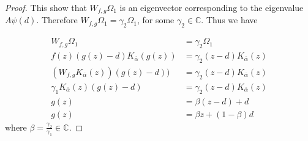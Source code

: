 \documentclass[reqno]{amsart}
\theoremstyle{remark}
\theoremstyle{Definition}
\theoremstyle{remark}
\numberwithin{equation}{section}
\begin{document}
\begin{proof}
This show that $W_{f,g}\Omega_{1}$  is an eigenvector corresponding to the eigenvalue $A\psi(d)$. Therefore $W_{f,g}\Omega_{1}=\gamma_{2}\Omega_{1}$, for some $\gamma_{2} \in \mathbb{C}$. Thus we have

\begin{align*}
   W_{f,g}\Omega_{1}&=\gamma_{2}\Omega_{1}\\
    f(z) (g(z)-d)K_{\overline{\alpha}}(g(z))&= \gamma_{2} (z-d)K_{\overline{\alpha}}(z)\\
    (W_{f,g}K _{\overline{\alpha}}(z))(g(z)-d))&= \gamma_{2}(z-d)K_{\overline{\alpha}}(z)\\
    \gamma_{1}K_{\overline{\alpha}}(z)(g(z)-d)&=\gamma_{2} (z-d)K_{\overline{\alpha}}(z)\\
    g(z)&=\beta(z-d)+d\\
    g(z)&=\beta z+ (1-\beta) d
\end{align*}
where $\beta=\frac{\gamma_{2}}{\gamma_{1}} \in \mathbb{C}.$


\end{proof}
\end{document}
